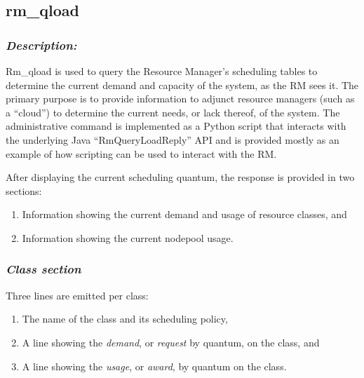        
\iffalse  %

\subsection{rm\_qload}
\label{subsec:admin.rm-qload}

    \subsubsection{{\em Description:}}
    Rm\_qload is used to query the Resource Manager's scheduling tables to determine the
    current demand and capacity of the system, as the RM sees it.  The primary purpose
    is to provide information to adjunct resource managers (such as a ``cloud'') to
    determine the current needs, or lack thereof, of the system.  The administrative
    command is implemented as a Python script that interacts with the underlying
    Java ``RmQueryLoadReply'' API and is provided mostly as an example of how
    scripting can be used to interact with the RM.

    After displaying the current scheduling quantum, the response is provided in two sections:
    \begin{enumerate}
      \item Information showing the current demand and usage of resource classes, and
      \item Information showing the current nodepool usage.
    \end{enumerate}

    \subsubsection{\em Class section}
    Three lines are emitted per class:
    \begin{enumerate}
      \item The name of the class and its scheduling policy,
      \item A line showing the {\em demand}, or {\em request} by quantum, on the class, and
      \item A line showing the {\em usage}, or {\em award}, by quantum on the class.
    \end{enumerate}
    
